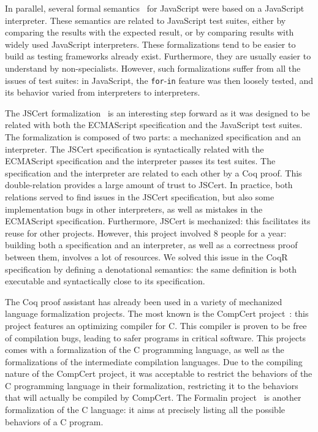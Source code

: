 \documentclass[
    sigplan,
    10pt,
    review, %
    natbib=false %
 ]{acmart}
\begin{document}
In parallel, several formal semantics~\parencite{js-ml, Guha2010, Politz:S5, kjs}
for JavaScript were based on a JavaScript interpreter.
These semantics are related to JavaScript test suites,
either by comparing the results with the expected result,
or by comparing results with widely used JavaScript interpreters.
These formalizations tend to be easier to build
as testing frameworks already exist.
Furthermore, they are usually easier to understand by non-specialists.
However, such formalizations suffer from all the issues of test suites:
in JavaScript, the \texttt{for}-\texttt{in}
feature was then loosely tested,
and its behavior varied from interpreters to interpreters.

The JSCert formalization~\parencite{jscert, popl14jscert}
is an interesting step forward as it was designed
to be related with both the ECMAScript specification and the JavaScript test suites.
The formalization is composed of two parts:
a mechanized specification and an interpreter.
The JSCert specification is syntactically related with the ECMAScript specification
and the interpreter passes its test suites.
The specification and the interpreter are related to each other by a Coq proof.
This double-relation provides a large amount of trust to JSCert.
In practice, both relations served to find issues in the JSCert specification,
but also some implementation bugs in other interpreters,
as well as mistakes in the ECMAScript specification.
Furthermore, JSCert is mechanized:
this facilitates its reuse for other projects.
However, this project involved 8 people for a year:
building both a specification and an interpreter,
as well as a correctness proof between them, involves a lot of resources.
We solved this issue in the CoqR specification
by defining a denotational semantics:
the same definition is both executable and syntactically close to its specification.

The Coq proof assistant has already been used
in a variety of mechanized language formalization projects.
The most known is the CompCert project~\cite{Leroy-Compcert-CACM}:
this project features an optimizing compiler for C.
This compiler is proven to be free of compilation bugs,
leading to safer programs in critical software.
This projects comes with a formalization of the C programming language,
as well as the formalizations of the intermediate compilation languages.
%
Due to the compiling nature of the CompCert project,
it was acceptable to restrict the behaviors of the C programming language
in their formalization,
restricting it to the behaviors that will actually be compiled by CompCert.
The Formalin project~\parencite{formalin} is another formalization
of the C language:
it aims at precisely listing all the possible behaviors of a C program.
\end{document}
